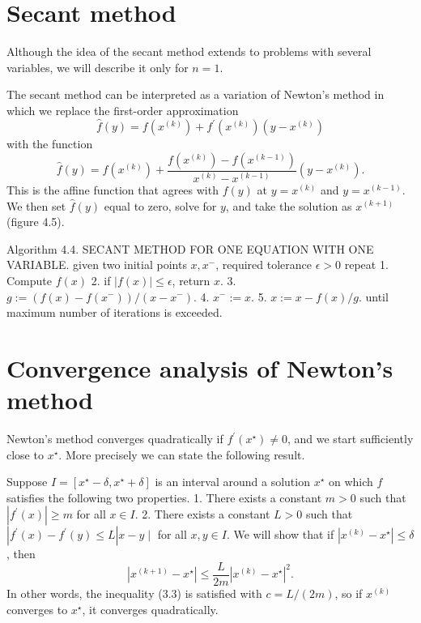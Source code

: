 \section{Secant method}

Although the idea of the secant method extends to problems with several variables,
we will describe it only for $n = 1$.

The secant method can be interpreted as a variation of Newton's method in which we replace the first-order approximation
$$
\hat{f}(y)=f\left(x^{(k)}\right)+f^{\prime}\left(x^{(k)}\right)\left(y-x^{(k)}\right)
$$
with the function
$$
\hat{f}(y)=f\left(x^{(k)}\right)+\frac{f\left(x^{(k)}\right)-f\left(x^{(k-1)}\right)}{x^{(k)}-x^{(k-1)}}\left(y-x^{(k)}\right) .
$$
This is the affine function that agrees with $ f(y) $ at $ y=x^{(k)} $ and $ y=x^{(k-1)} $. We then set $ \hat{f}(y) $ equal to zero, solve for $ y $, and take the solution as $ x^{(k+1)} $ (figure 4.5).

\begin{algorithm}
    Algorithm 4.4. SECANT METHOD FOR ONE EQUATION WITH ONE VARIABLE.
given two initial points $ x, x^{-} $, required tolerance $ \epsilon>0 $
repeat
1. Compute $ f(x) $
2. if $ |f(x)| \leq \epsilon $, return $ x $.
3. $ g:=\left(f(x)-f\left(x^{-}\right)\right) /\left(x-x^{-}\right) $.
4. $ x^{-}:=x $.
5. $ x:=x-f(x) / g $.
until maximum number of iterations is exceeded.
\end{algorithm}

\section{ Convergence analysis of Newton's method}

Newton's method converges quadratically if $ f^{\prime}\left(x^{\star}\right) \neq 0 $, and we start sufficiently close to $ x^{\star} $. More precisely we can state the following result.

Suppose $ I=\left[x^{\star}-\delta, x^{\star}+\delta\right] $ is an interval around a solution $ x^{\star} $ on which $ f $ satisfies the following two properties.
1. There exists a constant $ m>0 $ such that $ \left|f^{\prime}(x)\right| \geq m $ for all $ x \in I $.
2. There exists a constant $ L>0 $ such that $ \left|f^{\prime}(x)-f^{\prime}(y) \leq L\right| x-y \mid $ for all $ x, y \in I $.
We will show that if $ \left|x^{(k)}-x^{\star}\right| \leq \delta $, then
$$
\left|x^{(k+1)}-x^{\star}\right| \leq \frac{L}{2 m}\left|x^{(k)}-x^{\star}\right|^{2} .
$$
In other words, the inequality (3.3) is satisfied with $ c=L /(2 m) $, so if $ x^{(k)} $ converges to $ x^{\star} $, it converges quadratically.

